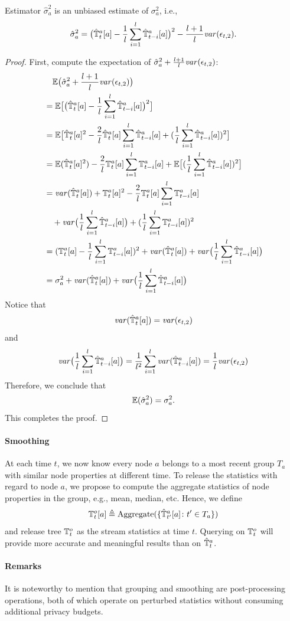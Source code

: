 \begin{theorem}\label{thm:sigma}
  Estimator $\hat{\sigma}_a^2$ is an unbiased estimate of $\sigma_a^2$, i.e.,
  \[
    \hat{\sigma}_a^2
    = \big(\hat{\mathbb{T}}^a_t[a] -\frac{1}{l}\sum_{i=1}^l\hat{\mathbb{T}}^a_{t-i}[a]\big)^2
    -\frac{l+1}{l}\mathit{var}(\epsilon_{t,2}).
  \]
\end{theorem}


\begin{proof}
First, compute the expectation of $\hat{\sigma}_a^2 + \frac{l+1}{l} \mathit{var}(\epsilon_{t,2})$:
{\allowdisplaybreaks
\begin{align*}
  &\quad \mathbb{E}\big(\hat{\sigma}_a^2+\frac{l+1}{l}\mathit{var}(\epsilon_{t,2})\big) \\
  &= \mathbb{E}\big[ \big(\hat{\mathbb{T}}^a_t[a] -\frac{1}{l}\sum_{i=1}^l\hat{\mathbb{T}}^a_{t-i}[a]\big)^2 \big] \\
  &= \mathbb{E}\big[ \hat{\mathbb{T}}^a_t[a]^2 -\frac{2}{l}\hat{\mathbb{T}}^a_t[a]\sum_{i=1}^l\hat{\mathbb{T}}^a_{t-i}[a]
    +(\frac{1}{l}\sum_{i=1}^l\hat{\mathbb{T}}^a_{t-i}[a])^2 \big] \\
  &= \mathbb{E}(\hat{\mathbb{T}}^a_t[a]^2) -\frac{2}{l}\mathbb{T}^a_t[a]\sum_{i=1}^l\mathbb{T}^a_{t-i}[a]
    +\mathbb{E}\big[ (\frac{1}{l}\sum_{i=1}^l\hat{\mathbb{T}}^a_{t-i}[a])^2 \big] \\
  &= \mathit{var}(\hat{\mathbb{T}}^a_t[a]) + \mathbb{T}^a_t[a]^2 -\frac{2}{l}\mathbb{T}^a_t[a]\sum_{i=1}^l\mathbb{T}^a_{t-i}[a] \\
  &\quad +\mathit{var}\big( \frac{1}{l}\sum_{i=1}^l\hat{\mathbb{T}}^a_{t-i}[a] \big)
    +(\frac{1}{l}\sum_{i=1}^l\mathbb{T}^a_{t-i}[a])^2 \\
  &= (\mathbb{T}^a_t[a]-\frac{1}{l}\sum_{i=1}^l\mathbb{T}^a_{t-i}[a])^2
    + \mathit{var}(\hat{\mathbb{T}}^a_t[a]) +\mathit{var}\big( \frac{1}{l}\sum_{i=1}^l\hat{\mathbb{T}}^a_{t-i}[a] \big) \\
  &= \sigma_a^2
    + \mathit{var}(\hat{\mathbb{T}}^a_t[a]) +\mathit{var}\big( \frac{1}{l}\sum_{i=1}^l\hat{\mathbb{T}}^a_{t-i}[a] \big)
\end{align*}
}
Notice that
\[
  \mathit{var}(\hat{\mathbb{T}}^a_t[a]) = \mathit{var}(\epsilon_{t,2})
\]
and
\[
  \mathit{var}\big( \frac{1}{l}\sum_{i=1}^l\hat{\mathbb{T}}^a_{t-i}[a] \big)
  = \frac{1}{l^2}\sum_{i=1}^l\mathit{var}(\hat{\mathbb{T}}^a_{t-i}[a])
  = \frac{1}{l}\mathit{var}(\epsilon_{t,2})
\]
Therefore, we conclude that
\[
  \mathbb{E}(\hat{\sigma}_a^2) = \sigma_a^2.
\]
This completes the proof.
\end{proof}

\paragraph{Smoothing}
At each time $t$, we now know every node $a$ belongs to a most recent group
$T_a$ with similar node properties at different time.
To release the statistics with regard to node $a$, we propose to compute the
aggregate statistics of node properties in the group, e.g., mean, median, etc.
Hence, we define
\[
  \mathbb{T}^o_t[a] \triangleq \text{Aggregate}(\{\hat{\mathbb{T}}^a_{t'}[a]\colon t'\in T_a\})
\]
and release tree $\mathbb{T}^o_t$ as the stream statistics at time $t$.
Querying on $\mathbb{T}^o_t$ will provide more accurate and meaningful results than on
$\hat{\mathbb{T}}^a_t$.

\paragraph{Remarks}
It is noteworthy to mention that grouping and smoothing are post-processing
operations, both of which operate on perturbed statistics without consuming
additional privacy budgets.
